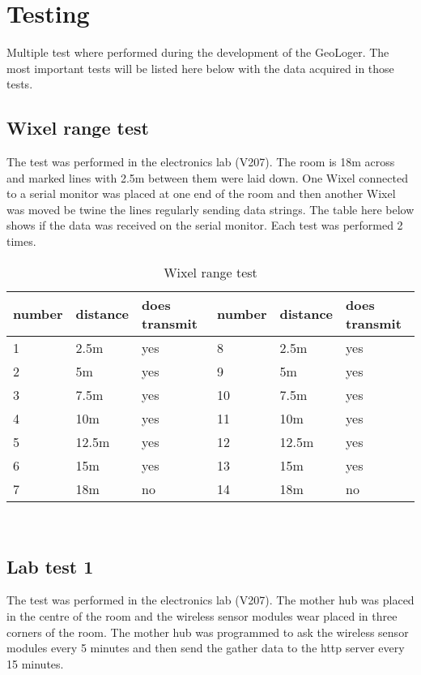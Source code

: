 \section{Testing}
Multiple test where performed during the development of the GeoLoger. The most important tests will be listed here below with the data acquired in those tests.

\subsection{Wixel range test}
The test was performed in the electronics lab (V207). The room is 18m across and marked lines with 2.5m  between them were laid down. One Wixel connected to a serial monitor was placed at one end of the room and then another Wixel was moved be twine the lines regularly sending data strings. The table here below shows if the data was received on the serial monitor. Each test was performed 2 times.
\begin{table}[H]
		 \centering
 	 	     \begin{tabular}
 	 	     	{| p{2cm} |  p{2cm} | p{3cm} | p{2cm}  | p{2cm} | p{3cm} |}
 	 	    	 \hline
 	 	    	  number & distance	& does transmit & number	& distance   & does transmit 			\\ \hline
 	 	  		 1 & 	2.5m & yes	& 8	 & 2.5m & yes \\ \hline
 	 	  		 2 &	5m	 & yes	& 9	 &   5m & yes \\ \hline 
 	 	  	 	 3 &	7.5m & yes	& 10 & 7.5m & yes \\ \hline 
 	 	  	 	 4 &    10m	 & yes  & 11 &	10m	& yes \\ \hline 
 	 	  	 	 5 &	12.5m& yes	& 12 & 12.5m& yes \\ \hline 
 	 	  	 	 6 &	15m	 & yes	& 13 &  15m & yes \\ \hline 
 	 	  	 	 7 &	18m	 & no	& 14 &  18m	& no  \\ \hline 
 
 	 	     \end{tabular}\\
 	 	     \label{table:Table_3}
 	 	     \caption{Wixel range test}
 	 	 \end{table}
 	 	 
\subsection{Lab test 1}
The test was performed in the electronics lab (V207). The mother hub was placed in the centre of the room and the wireless sensor modules wear placed in three corners of the room. The mother hub was programmed to ask the wireless sensor modules every 5 minutes and then send the gather data to the http server every 15 minutes. 

